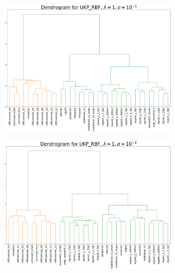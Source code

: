 \documentclass{article}
\theoremstyle{plain}
\begin{document}
\begin{figure}[!h]
    \centering
    \begin{subfigure}[b]{0.45\textwidth}
        \includegraphics[width=\textwidth]{Appendix figures/imagenet_experiments/Dendogram final/Dendogram for UKP_dist_RBF_1.000000e+00_1.000000e-01.png}
    \end{subfigure}
    \hfill
    \begin{subfigure}[b]{0.45\textwidth}
        \includegraphics[width=\textwidth]{Appendix figures/imagenet_experiments/Dendogram final/Dendogram for UKP_dist_RBF_1.000000e+00_1.000000e-02.png}
    \end{subfigure}
    

\end{figure}
\end{document}
